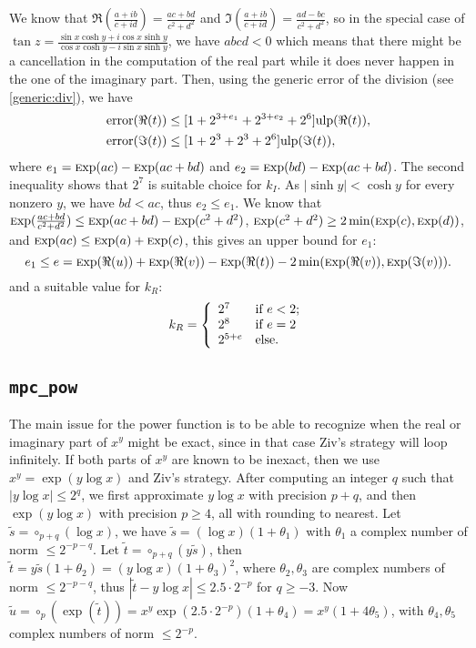\documentclass {article}
\newcommand {\Ulp}{{\rm ulp}}
\DeclareMathOperator{\error}{error}
\DeclareMathOperator{\Exp}{{\rm \textsc exp}}
\begin{document}
We know that $\Re(\frac{a+i b}{c+i d})=\frac{a c +b d}{c^2 + d^2}$ and
$\Im(\frac{a+i b}{c+i d})=\frac{a d -b c}{c^2 + d^2}$, so in the special case
of $\tan z=\frac{\sin x\cosh y+i\cos x\sinh y}{\cos x\cosh y-i\sin x\sinh y}$,
we have $abcd < 0$ which means that there might be a cancellation in the
computation of the real part while it does never happen in the one of the
imaginary part.  Then, using the generic error of the division (see
\ref{generic:div}), we have
\begin{align*}
\error(\Re(t)) &\leq [1+2^{3+e_1}+2^{3+e_2}+2^6] \Ulp(\Re(t)),
\\
\error(\Im(t)) &\leq [1+2^3+2^3+2^6] \Ulp(\Im(t)),
\end{align*}
where $e_1=\Exp(a c) -\Exp(a c+b d)$ and $e_2=\Exp(b d) -\Exp(a c+b d)$.  The
second inequality shows that $2^7$ is suitable choice for $k_I$. As $|\sinh
y|<\cosh y$ for every nonzero $y$, we have $bd<ac$, thus $e_2\leq e_1$. We
know that $\Exp(\frac{a c+b d}{c^2+d^2})\leq \Exp(a c+b d) -\Exp(c^2+d^2)$,
$\Exp(c^2+d^2)\geq2 \min(\Exp(c), \Exp(d))$, and $\Exp(ac) \leq \Exp(a) +
\Exp(c)$, this gives an upper bound for $e_1$:
\[
e_1 \leq e = \Exp(\Re(u)) +\Exp(\Re(v)) -\Exp(\Re(t))
-2 \min(\Exp(\Re(v)), \Exp(\Im(v))).
\]
and a suitable value for $k_R$:
\begin{equation*}
k_R=\left\{
\begin{array}{l l}
  2^7 & \mbox{if $e < 2$;}
  \\
  2^8 & \mbox{if $e = 2$}
  \\
  2^{5 + e} & \mbox{else.}
\end{array}
\right.
\end{equation*}

\subsection {\texttt {mpc\_pow}}

The main issue for the power function is to be able to recognize when the
real or imaginary part of $x^y$ might be exact, since in that case
Ziv's strategy will loop infinitely.
If both parts of $x^y$ are known to be inexact, then we use
$x^y = \exp(y \log x)$ and Ziv's strategy.
After computing an integer $q$ such that $|y \log x| \leq 2^q$, we first
approximate $y \log x$ with precision $p + q$, and then
$\exp(y \log x)$ with precision $p \geq 4$, all with rounding
to nearest.
Let $\tilde{s} = \circ_{p+q}(\log x)$,
we have $\tilde{s} = (\log x) (1 + \theta_1)$
with $\theta_1$ a complex number of norm $\leq 2^{-p-q}$.
Let $\tilde{t} = \circ_{p+q}(y \tilde{s})$, then
$\tilde{t} = y \tilde{s} (1 + \theta_2) = (y \log x) (1 + \theta_3)^2$,
where $\theta_2, \theta_3$ are complex numbers of norm $\leq 2^{-p-q}$,
thus $|\tilde{t} - y \log x| \leq 2.5 \cdot 2^{-p}$ for $q \geq -3$.
Now $\tilde{u} = \circ_p(\exp(\tilde{t})) =
x^y \exp(2.5 \cdot 2^{-p}) (1 + \theta_4) = x^y (1 + 4 \theta_5)$,
with $\theta_4, \theta_5$ complex numbers of norm $\leq 2^{-p}$.
\end{document}

